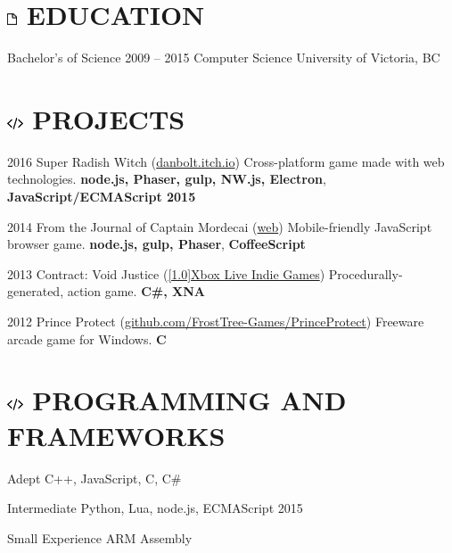 \documentclass[10pt]{tccv}
\begin{document}
\section{\includegraphics[height=10pt, keepaspectratio=true]{file} EDUCATION}

\begin{yearlist}

\item[Bachelor's of Science]{2009 -- 2015}
     {Computer Science}
     {University of Victoria, BC}

\end{yearlist}

\section{\includegraphics[height=10pt, keepaspectratio=true]{code} PROJECTS}

\begin{yearlist}

\item{2016}
     {Super Radish Witch (\href{http://danbolt.itch.io/superradishwitch}{danbolt.itch.io})}
     {Cross-platform game made with web technologies. \textbf{node.js, Phaser, gulp, NW.js, Electron}, \textbf{JavaScript/ECMAScript 2015}}

\item{2014}
     {From the Journal of Captain Mordecai (\href{http://danbolt.github.io/CaptainMordecai/}{web})}
     {Mobile-friendly JavaScript browser game. \textbf{node.js, gulp, Phaser}, \textbf{CoffeeScript}}

\item{2013}
     {Contract: Void Justice (\href{http://marketplace.xbox.com/en-US/Product/Contract-Void-Justice/66acd000-77fe-1000-9115-d80258550d94}{\scalebox{.8}[1.0]{Xbox Live Indie Games}})}
     {Procedurally-generated, action game. \textbf{C\#, XNA}}

\item{2012}
     {Prince Protect (\href{https://github.com/FrostTree-Games/PrinceProtect}{github.com/FrostTree-Games/PrinceProtect})}
     {Freeware arcade game for Windows. \textbf{C}}

\end{yearlist}

\section{\includegraphics[height=10pt, keepaspectratio=true]{code} PROGRAMMING AND FRAMEWORKS}

\begin{factlist}

\item{Adept}
     {C++, JavaScript, C, C\#}
     
\item{Intermediate}
	 {Python, Lua, node.js, ECMAScript 2015}

\item{Small Experience}
     {ARM Assembly }

\end{factlist}
\end{document}
